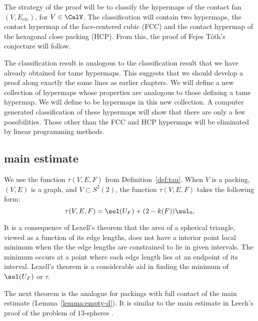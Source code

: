 The strategy of the proof will be to classify the hypermaps of the
contact fan $(V,E_{ctc})$, for $V\in \CalV$.  The classification will
contain two hypermaps, the contact hypermap of the face-centered cubic
(FCC) and the contact hypermap of the hexagonal close packing (HCP).
From this, the proof of Fejes T\'oth's conjecture will follow.

The classification result is analogous to the classification result
that we have already obtained for tame hypermaps.  This suggests that
we should develop a proof along exactly the same lines as earlier
chapters.  We will define a new collection of hypermaps whose
properties are analogous to those defining a tame hypermap.  We will
define  to be hypermaps in this
new collection.  A computer generated classification of these
hypermaps will show that there are only a few possibilities.  Those
other than the FCC and HCP hypermaps will be eliminated by linear
programming methods.

\subsection{main estimate}




We use the function $\tau(V,E,F)$ from Definition~\ref{def:tau}.  When
$V$ is a packing, $(V,E)$ is a  graph, and $V\subset
S^2(2)$, the function $\tau(V,E,F)$ takes the following form:
\begin{displaymath}
\tau(V,E,F) = \sol(U_F) + (2-k(F)) \sol_0,
\end{displaymath}

\begin{remark}
  It is a consequence of Lexell's theorem that the area of a spherical
  triangle, viewed as a function of its edge lengths, does not have a
  interior point local minimum when the the edge lengths are
  constrained to lie in given intervals.  The minimum occurs at a
  point where each edge length lies at an endpoint of its interval.
  Lexell's theorem is a considerable aid in finding the minimum of
  $\sol(U_F)$ or $\tau$.
\end{remark}

The next theorem is the analogue for packings with full contact of the
main estimate (Lemma~\ref{lemma:empty-d}).  It is similar to the main
estimate in Leech's proof of the problem of $13$-spheres
\cite{Leech:1956:MG}.


